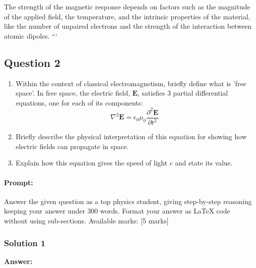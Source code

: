 \documentclass{article}
\begin{document}
The strength of the magnetic response depends on factors such as the magnitude of the applied field, the temperature, and the intrinsic properties of the material, like the number of unpaired electrons and the strength of the interaction between atomic dipoles.
```


\subsection{Question 2}
\begin{enumerate}
    \item Within the context of classical electromagnetism, briefly define what is 'free space'. In free space, the electric field, $\mathbf{E}$, satisfies 3 partial differential equations, one for each of its components:
    \[
    \nabla^2 \mathbf{E} = \epsilon_0 \mu_0 \frac{\partial^2 \mathbf{E}}{\partial t^2}
    \]
    \item Briefly describe the physical interpretation of this equation for showing how electric fields can propagate in space.
    \item Explain how this equation gives the speed of light $c$ and state its value.
\end{enumerate}


\paragraph{Prompt: \\} 
Answer the given question as a top physics student, giving step-by-step reasoning keeping your answer under 300 words. Format your answer as LaTeX code without using sub-sections. Available marks: [5 marks]

\subsubsection{Solution 1}
\textbf{Answer:}
\end{document}
